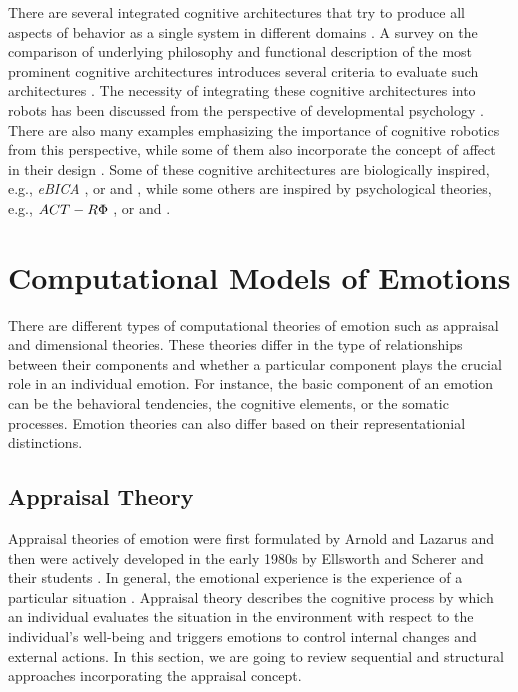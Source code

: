 \documentclass[12pt]{report}
\begin{document}
There are several integrated cognitive architectures that try to produce all
aspects of behavior as a single system in different domains
\cite{anderson:act-r, laird:soar}. {\color{red}A survey on the comparison of
underlying philosophy and functional description of the most prominent cognitive
architectures introduces several criteria to evaluate such architectures}
\cite{chong:cognitive-architectures-survey,langley:cognitive-architectures,
thorisson:cognitive-architectures-autonomy}. The necessity of integrating these
cognitive architectures into robots has been discussed from the perspective of
developmental psychology \cite{asada:cognitive-robotics-humanoid,
d'mello:computational-functional-modeling,
kelley:cognitive-robotics-psychology}. There are also many examples emphasizing
the importance of cognitive robotics from this perspective, while some of them
also incorporate the concept of affect in their design
\cite{cai:affective-model-psi}. Some of these cognitive architectures are
biologically inspired, e.g., \textit{eBICA}
\cite{samsonovich:emotional-biologically-architecture}, or
\cite{baxter:cognitive-architecture-hri} and
\cite{ray:self-sustaining-architecture}, while some others are inspired by
psychological theories, e.g., $\MakeUppercase{ACT-R\Phi}$
\cite{dancy:actR-physiology-affect}, or
\cite{mirolli:vygotskyan-cognitive-robotics} and
\cite{dominey:shared-intention-cognition}.

\section{Computational Models of Emotions}
There are different types of computational theories of emotion such as
appraisal and dimensional theories. These theories differ in the type of
relationships between their components and whether a particular component plays
the crucial role in an individual emotion. For instance, the basic component of
an emotion can be the behavioral tendencies, the cognitive elements, or the
somatic processes. Emotion theories can also differ based on their
representationial distinctions.

\subsection{Appraisal Theory}
\label{sec:appraisal-theory}

Appraisal theories of emotion were first formulated by Arnold
\cite{arnold:emotion-personality} and Lazarus \cite{lazarus:emotion-adaptation}
and then were actively developed in the early 1980s by Ellsworth and Scherer and
their students \cite{roseman:appraisal-theory}
\cite{sander:systems-approach-appraisal} \cite{scherer:nature-function-emotion}
\cite{scherer:emotions-emergent} \cite{scherer:appraisal-processes}. In
general, the emotional experience is the experience of a particular situation
\cite{frijda:emotions}. Appraisal theory describes the cognitive process by
which an individual evaluates the situation in the environment with respect to
the individual's well-being and triggers emotions to control internal changes
and external actions. In this section, we are going to review sequential and
structural approaches incorporating the appraisal concept.
\end{document}
